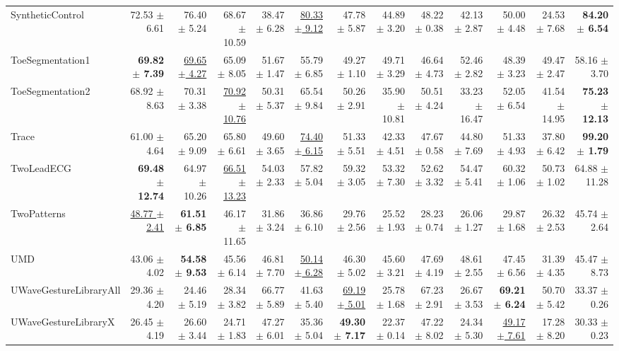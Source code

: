 \begin{landscape}
\begin{longtable}{lrrrrrrrrrrrr}
SyntheticControl & 72.53 $\pm$ 6.61 & 76.40 $\pm$ 5.24 & 68.67 $\pm$ 10.59 & 38.47 $\pm$ 6.28 & \underline{80.33 $\pm$ 9.12} & 47.78 $\pm$ 5.87 & 44.89 $\pm$ 3.20 & 48.22 $\pm$ 0.38 & 42.13 $\pm$ 2.87 & 50.00 $\pm$ 4.48 & 24.53 $\pm$ 7.68 & \textbf{84.20 $\pm$ 6.54} \\
ToeSegmentation1 & \textbf{69.82 $\pm$ 7.39} & \underline{69.65 $\pm$ 4.27} & 65.09 $\pm$ 8.05 & 51.67 $\pm$ 1.47 & 55.79 $\pm$ 6.85 & 49.27 $\pm$ 1.10 & 49.71 $\pm$ 3.29 & 46.64 $\pm$ 4.73 & 52.46 $\pm$ 2.82 & 48.39 $\pm$ 3.23 & 49.47 $\pm$ 2.47 & 58.16 $\pm$ 3.70 \\
ToeSegmentation2 & 68.92 $\pm$ 8.63 & 70.31 $\pm$ 3.38 & \underline{70.92 $\pm$ 10.76} & 50.31 $\pm$ 5.37 & 65.54 $\pm$ 9.84 & 50.26 $\pm$ 2.91 & 35.90 $\pm$ 10.81 & 50.51 $\pm$ 4.24 & 33.23 $\pm$ 16.47 & 52.05 $\pm$ 6.54 & 41.54 $\pm$ 14.95 & \textbf{75.23 $\pm$ 12.13} \\
Trace & 61.00 $\pm$ 4.64 & 65.20 $\pm$ 9.09 & 65.80 $\pm$ 6.61 & 49.60 $\pm$ 3.65 & \underline{74.40 $\pm$ 6.15} & 51.33 $\pm$ 5.51 & 42.33 $\pm$ 4.51 & 47.67 $\pm$ 0.58 & 44.80 $\pm$ 7.69 & 51.33 $\pm$ 4.93 & 37.80 $\pm$ 6.42 & \textbf{99.20 $\pm$ 1.79} \\
TwoLeadECG & \textbf{69.48 $\pm$ 12.74} & 64.97 $\pm$ 10.26 & \underline{66.51 $\pm$ 13.23} & 54.03 $\pm$ 2.33 & 57.82 $\pm$ 5.04 & 59.32 $\pm$ 3.05 & 53.32 $\pm$ 7.30 & 52.62 $\pm$ 3.32 & 54.47 $\pm$ 5.41 & 60.32 $\pm$ 1.06 & 50.73 $\pm$ 1.02 & 64.88 $\pm$ 11.28 \\
TwoPatterns & \underline{48.77 $\pm$ 2.41} & \textbf{61.51 $\pm$ 6.85} & 46.17 $\pm$ 11.65 & 31.86 $\pm$ 3.24 & 36.86 $\pm$ 6.10 & 29.76 $\pm$ 2.56 & 25.52 $\pm$ 1.93 & 28.23 $\pm$ 0.74 & 26.06 $\pm$ 1.27 & 29.87 $\pm$ 1.68 & 26.32 $\pm$ 2.53 & 45.74 $\pm$ 2.64 \\
UMD & 43.06 $\pm$ 4.02 & \textbf{54.58 $\pm$ 9.53} & 45.56 $\pm$ 6.14 & 46.81 $\pm$ 7.70 & \underline{50.14 $\pm$ 6.28} & 46.30 $\pm$ 5.02 & 45.60 $\pm$ 3.21 & 47.69 $\pm$ 4.19 & 48.61 $\pm$ 2.55 & 47.45 $\pm$ 6.56 & 31.39 $\pm$ 4.35 & 45.47 $\pm$ 8.73 \\
UWaveGestureLibraryAll & 29.36 $\pm$ 4.20 & 24.46 $\pm$ 5.19 & 28.34 $\pm$ 3.82 & 66.77 $\pm$ 5.89 & 41.63 $\pm$ 5.40 & \underline{69.19 $\pm$ 5.01} & 25.78 $\pm$ 1.68 & 67.23 $\pm$ 2.91 & 26.67 $\pm$ 3.53 & \textbf{69.21 $\pm$ 6.24} & 50.70 $\pm$ 5.42 & 33.37 $\pm$ 0.26 \\
UWaveGestureLibraryX & 26.45 $\pm$ 4.19 & 26.60 $\pm$ 3.44 & 24.71 $\pm$ 1.83 & 47.27 $\pm$ 6.01 & 35.36 $\pm$ 5.04 & \textbf{49.30 $\pm$ 7.17} & 22.37 $\pm$ 0.14 & 47.22 $\pm$ 8.02 & 24.34 $\pm$ 5.30 & \underline{49.17 $\pm$ 7.61} & 17.28 $\pm$ 8.20 & 30.33 $\pm$ 0.23 \\

\end{longtable}
\end{landscape}
